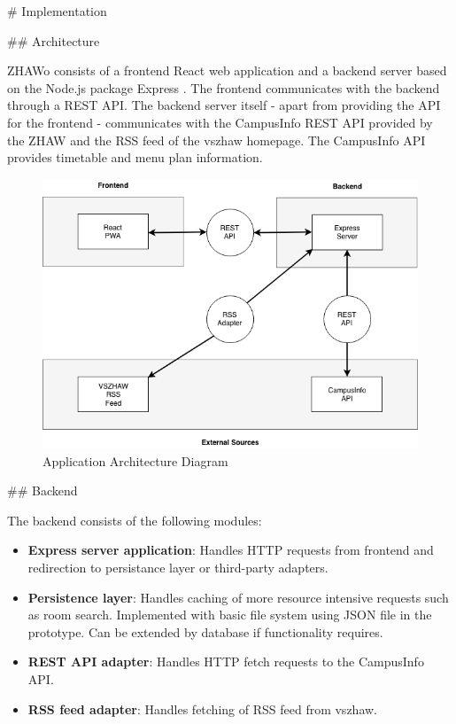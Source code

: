 \begin{markdown}

# Implementation

## Architecture

ZHAWo consists of a frontend React \cite{React} web application and a backend server based on the Node.js \cite{Node} package Express \cite{Express}. The frontend communicates with the backend through a REST API. The backend server itself - apart from providing the API for the frontend - communicates with the CampusInfo REST API provided by the ZHAW and the RSS feed of the vszhaw homepage. The CampusInfo API provides timetable and menu plan information.

\bigskip

\begin{figure}[H]
  \includegraphics[width=14cm, center]{../../diagrams/applicationArchitecture.png}
  \caption{\textsf{Application Architecture Diagram}}
\end{figure}

\bigskip

## Backend

The backend consists of the following modules:

\begin{itemize}
  \item \textbf{Express server application}: Handles HTTP requests from frontend and redirection to persistance layer or third-party adapters.
  \item \textbf{Persistence layer}: Handles caching of more resource intensive requests such as room search. Implemented with basic file system using JSON file in the prototype. Can be extended by database if functionality requires.
  \item \textbf{REST API adapter}: Handles HTTP fetch requests to the CampusInfo API.
  \item \textbf{RSS feed adapter}: Handles fetching of RSS feed from vszhaw.
\end{itemize}


\end{markdown}
